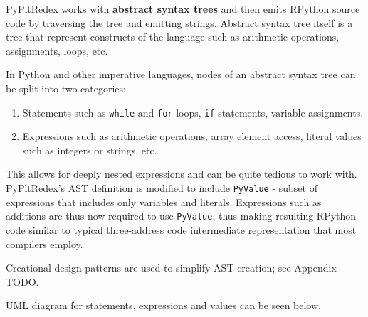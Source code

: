 PyPltRedex works with \textbf{abstract syntax trees} and then emits RPython source code by traversing the tree and emitting strings. Abstract syntax tree itself is a tree that represent constructs of the language such as arithmetic operations, assignments, loops, etc.

In Python and other imperative languages, nodes of an abstract syntax tree can be split into two categories:

\begin{enumerate}
\item
Statements such as \texttt{while} and \texttt{for} loops, \texttt{if} statements, variable assignments.
\item
Expressions such as arithmetic operations, array element access, literal values such as integers or strings, etc.
\end{enumerate}

This allows for deeply nested expressions and can be quite tedious to work with. PyPltRedex's AST definition is modified to include \texttt{PyValue} - subset of expressions that includes only variables and literals. Expressions such as additions are thus now required to use \texttt{PyValue}, thus making resulting RPython code similar to typical three-address code intermediate representation that most compilers employ.

Creational design patterns are used to simplify AST creation; see Appendix TODO.

UML diagram for statements, expressions and values can be seen below. 
